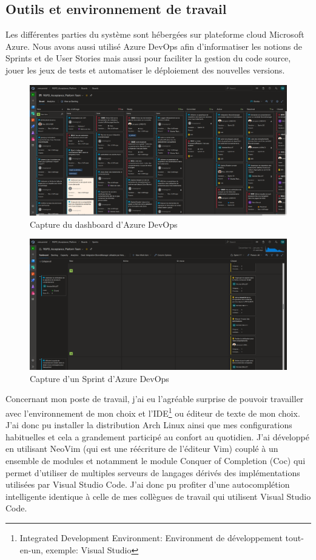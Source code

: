\documentclass[12pt, a4paper]{report}
\newcommand\tab[1][1cm]{\hspace*{#1}}
\begin{document}
\subsection{Outils et environnement de travail}
\tab{}Les différentes parties du système sont hébergées sur plateforme cloud Microsoft Azure.\newline
Nous avons aussi utilisé Azure DevOps afin d'informatiser les notions de Sprints et de User Stories mais aussi pour faciliter la gestion du code source, jouer les jeux de tests et automatiser le déploiement des nouvelles versions.\newline
\begin{figure}[H]
    \centering
    \includegraphics[width=\textwidth]{dashboard_azure.png}
    \caption{Capture du dashboard d'Azure DevOps}
\end{figure}
\begin{figure}[H]
    \centering
    \includegraphics[width=\textwidth]{sprint_azure.png}
    \caption{Capture d'un Sprint d'Azure DevOps}
\end{figure}

\tab{}Concernant mon poste de travail, j'ai eu l'agréable surprise de pouvoir travailler avec l'environnement de mon choix et l'IDE\footnote{Integrated Development Environment: Environment de développement tout-en-un, exemple: Visual Studio} ou éditeur de texte de mon choix. J'ai donc pu installer la distribution Arch Linux ainsi que mes configurations habituelles et cela a grandement participé au confort au quotidien. J'ai développé en utilisant NeoVim (qui est une réécriture de l'éditeur Vim) couplé à un ensemble de modules et notamment le module Conquer of Completion (Coc) qui permet d'utiliser de multiples serveurs de langages dérivés des implémentations utilisées par Visual Studio Code. J'ai donc pu profiter d'une autocomplétion intelligente identique à celle de mes collègues de travail qui utilisent Visual Studio Code.
\end{document}
